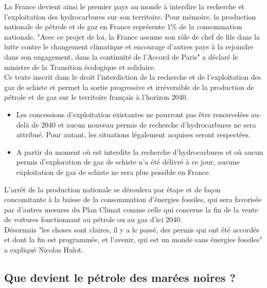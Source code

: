 \documentclass[8pt]{article}
\begin{document}
La France devient ainsi le premier pays au monde à interdire la recherche et l’exploitation des hydrocarbures sur son territoire. Pour mémoire, la production nationale de pétrole et de gaz en France représente 1\% de la consommation nationale. "Avec ce projet de loi, la France assume son rôle de chef de file dans la lutte contre le changement climatique et encourage d’autres pays à la rejoindre dans son engagement, dans la continuité de l’Accord de Paris" a déclaré le ministre de la Transition écologique et solidaire.\\

Ce texte inscrit dans le droit l’interdiction de la recherche et de l’exploitation des gaz de schiste et permet la sortie progressive et irréversible de la production de pétrole et de gaz sur le territoire français à l'horizon 2040.\\

\begin{itemize}
	\item Les concessions d'exploitation existantes ne pourront pas être renouvelées au-delà de 2040 et aucun nouveau permis de recherche d'hydrocarbures ne sera attribué. Pour autant, les situations légalement acquises seront respectées.
	\item A partir du moment où est interdite la recherche d’hydrocarbures et où aucun permis d’exploration de gaz de schiste n’a été délivré à ce jour, aucune exploitation de gaz de schiste ne sera plus possible en France. 
\end{itemize}

L’arrêt de la production nationale se déroulera par étape et de façon concomitante à la baisse de la consommation d’énergies fossiles, qui sera favorisée par d’autres mesures du Plan Climat comme celle qui concerne la fin de la vente de voitures fonctionnant au pétrole ou au gaz d’ici 2040.\\

Désormais "les choses sont claires, il y a le passé, des permis qui ont été accordés et dont la fin est programmée, et l’avenir, qui est un monde sans énergies fossiles" a expliqué Nicolas Hulot.

\newpage
\subsection{Que devient le pétrole des marées noires ?}
\label{sec:marrenoire}
\end{document}
